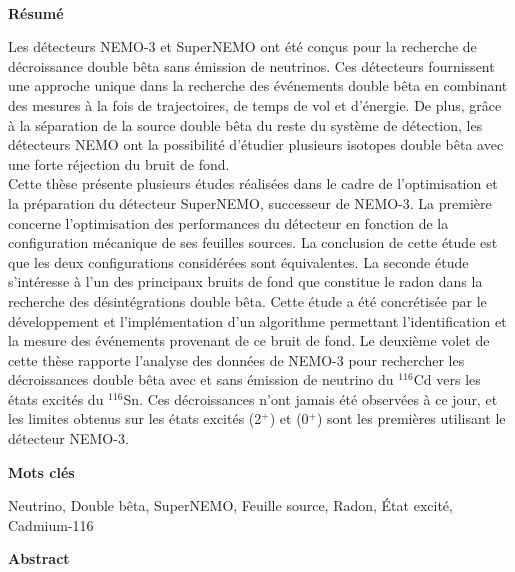 \documentclass[main.tex]{subfiles}
\begin{document}
\begin{changemargin}{-2cm}{-1cm}

\begin{multicols}{2}\\


\NI \textbf{R\'esum\'e}

\bigskip

\NI \small{Les détecteurs NEMO-3 et SuperNEMO ont été conçus pour la recherche de décroissance double bêta sans émission de neutrinos. Ces détecteurs fournissent une approche unique dans la recherche des événements double bêta en combinant des mesures à la fois de trajectoires, de temps de vol et d'énergie. De plus, grâce à la séparation de la source double bêta du reste du système de détection, les détecteurs NEMO ont la possibilité d'étudier plusieurs isotopes double bêta avec une forte réjection du bruit de fond. \\
\noindent Cette thèse présente plusieurs études réalisées dans le cadre de l'optimisation et la préparation du détecteur SuperNEMO, successeur de NEMO-3. La première concerne l'optimisation des performances du détecteur en fonction de la configuration mécanique de ses feuilles sources. La conclusion de cette étude est que les deux configurations considérées sont équivalentes. La seconde étude s'intéresse à l'un des principaux bruits de fond que constitue le radon dans la recherche des désintégrations double bêta. Cette étude a été concrétisée par le développement et l'implémentation d'un algorithme permettant l'identification et la mesure des événements provenant de ce bruit de fond. Le deuxième volet de cette thèse rapporte l'analyse des données de NEMO-3 pour rechercher les décroissances double bêta avec et sans émission de neutrino du $^{\text{116}}$Cd vers les états excités du $^{\text{116}}$Sn. Ces décroissances n'ont jamais été observées à ce jour, et les limites obtenus sur les états excités (2$^+$) et (0$^+$) sont les premières utilisant le détecteur NEMO-3.}


\bigskip

\NI \textbf{Mots clés}

\bigskip

\NI \small{Neutrino, Double bêta, SuperNEMO, Feuille source, Radon, État excité, Cadmium-116}




\NI \textbf{Abstract}

\bigskip


\end{multicols}
\end{changemargin}
\end{document}

